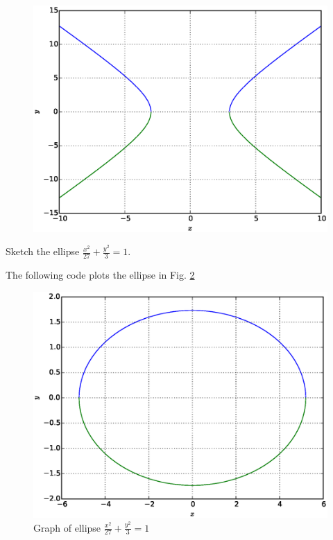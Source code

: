 \documentclass[journal,12pt,twocolumn]{IEEEtran}
\begin{document}
\begin{figure}
\begin{center}
\includegraphics[width=\columnwidth]{./figs/ee16b1012}
\end{center}
\label{fig_12}	
\end{figure}
%
\begin{problem}
Sketch the ellipse $\frac{x^2}{27} + \frac{y^2}{3} = 1$.
\end{problem}
\solution The following code plots the ellipse in Fig. \ref{fig_13}

\begin{figure}[h]
\centering
\includegraphics[width=\columnwidth]{./figs/ee16b1013}
\caption{Graph of ellipse $\displaystyle\frac{x^2}{27} +  \frac{y^2}{3} = 1$ }
\label{fig_13}	
\end{figure}
\end{document}
